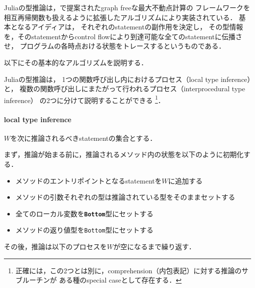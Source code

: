 Juliaの型推論は，\cite{graph-free-data-flow-analysis}で提案されたgraph freeな最大不動点計算の
フレームワークを相互再帰関数も扱えるように拡張したアルゴリズムにより実装されている．
基本となるアイディアは，
それぞれのstatementの副作用を決定し，
その型情報を，そのstatementからcontrol flowにより到達可能な全てのstatementに伝播させ，
プログラムの各時点おける状態をトレースするというものである．

以下にその基本的なアルゴリズムを説明する\cite{jameson, julia-2012}．

Juliaの型推論は，
1つの関数呼び出し内におけるプロセス（local type inference）と，
複数の関数呼び出しにまたがって行われるプロセス（interprocedural type inference）
の2つに分けて説明することができる
\footnote{
  正確には，この2つとは別に，comprehension（内包表記）に対する推論のサブルーチンが
  ある種のspecial caseとして存在する\cite{jameson}．
}．

\paragraph{local type inference}

$W$を次に推論されるべきstatementの集合とする． %

まず，推論が始まる前に，推論されるメソッド内の状態を以下のように初期化する．

\begin{itemize}
  \item メソッドのエントリポイントとなるstatementを$W$に追加する
  \item メソッドの引数それぞれの型は推論されている型をそのままセットする
  \item 全てのローカル変数を\textbf{\texttt{Bottom}}型\footnotemark にセットする
  \item メソッドの返り値型を\verb|Bottom|型\footnotemark[\value{footnote}] にセットする
\end{itemize}


その後，推論は以下のプロセスを$W$が空になるまで繰り返す．

